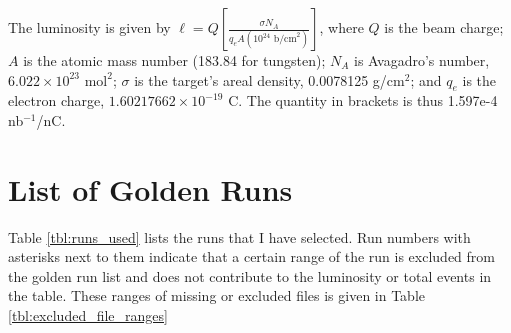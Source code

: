 \documentclass[11pt]{article}
\begin{document}

The luminosity is given by $\ell = Q \left[\frac{\sigma N_A}{q_eA(10^{24}\textrm{ b/cm}^2)}\right]$, where $Q$ is the beam charge; $A$ is the atomic mass number (183.84 for tungsten); $N_A$ is Avagadro's number, $6.022\times 10^{23}\textrm{ mol}^2$; $\sigma$ is the target's areal density, 0.0078125 g/cm$^2$; and $q_e$ is the electron charge, $1.60217662 \times 10^{-19}$ C.  The quantity in brackets is thus 1.597e-4 nb$^{-1}$/nC.

\section{List of Golden Runs}
Table \ref{tbl:runs_used} lists the runs that I have selected.  Run numbers with asterisks next to them indicate that a certain range of the run is excluded from the golden run list and does not contribute to the luminosity or total events in the table.  These ranges of missing or excluded files is given in Table \ref{tbl:excluded_file_ranges}
\end{document}
